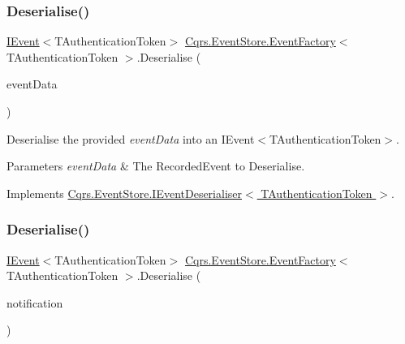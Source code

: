\subsubsection{\texorpdfstring{Deserialise()}{Deserialise()}\hspace{0.1cm}{\footnotesize\ttfamily [1/2]}}
{\footnotesize\ttfamily \hyperlink{interfaceCqrs_1_1Events_1_1IEvent}{I\+Event}$<$T\+Authentication\+Token$>$ \hyperlink{classCqrs_1_1EventStore_1_1EventFactory}{Cqrs.\+Event\+Store.\+Event\+Factory}$<$ T\+Authentication\+Token $>$.Deserialise (\begin{DoxyParamCaption}\item[{Recorded\+Event}]{event\+Data }\end{DoxyParamCaption})}



Deserialise the provided {\itshape event\+Data}  into an I\+Event$<$\+T\+Authentication\+Token$>$. 


\begin{DoxyParams}{Parameters}
{\em event\+Data} & The Recorded\+Event to Deserialise.\\
\hline
\end{DoxyParams}


Implements \hyperlink{interfaceCqrs_1_1EventStore_1_1IEventDeserialiser_ad84a4d975f6e2b5b1fef3fd23e738bfd_ad84a4d975f6e2b5b1fef3fd23e738bfd}{Cqrs.\+Event\+Store.\+I\+Event\+Deserialiser$<$ T\+Authentication\+Token $>$}.

\mbox{\label{classCqrs_1_1EventStore_1_1EventFactory_a1be7f3c4014991bc4b9619eaa2e8b9a4_a1be7f3c4014991bc4b9619eaa2e8b9a4}} 
\subsubsection{\texorpdfstring{Deserialise()}{Deserialise()}\hspace{0.1cm}{\footnotesize\ttfamily [2/2]}}
{\footnotesize\ttfamily \hyperlink{interfaceCqrs_1_1Events_1_1IEvent}{I\+Event}$<$T\+Authentication\+Token$>$ \hyperlink{classCqrs_1_1EventStore_1_1EventFactory}{Cqrs.\+Event\+Store.\+Event\+Factory}$<$ T\+Authentication\+Token $>$.Deserialise (\begin{DoxyParamCaption}\item[{Resolved\+Event}]{notification }\end{DoxyParamCaption})}



